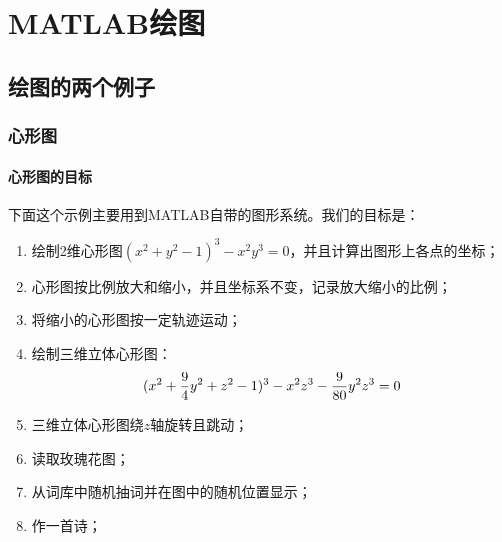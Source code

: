 % 
\chapter{MATLAB绘图}
\section{绘图的两个例子}
    \subsection{心形图}
        \subsubsection{心形图的目标}
            \par
            下面这个示例主要用到MATLAB自带的图形系统。我们的目标是：
            \begin{enumerate}
            \item 绘制2维心形图$(x^2+y^2-1)^3-x^2y^3=0$，并且计算出图形上各点的坐标；
            \item 心形图按比例放大和缩小，并且坐标系不变，记录放大缩小的比例；
            \item 将缩小的心形图按一定轨迹运动；
            \item 绘制三维立体心形图：
            \begin{equation*}
            \centering
            (x^2+\frac 94 y^2+z^2-1)^3-x^2z^3-\frac {9}{80}y^2z^3=0
             \end{equation*}
            \item 三维立体心形图绕$z$轴旋转且跳动；
            \item 读取玫瑰花图；
            \item 从词库中随机抽词并在图中的随机位置显示；
            \item 作一首诗；
            \end{enumerate}

